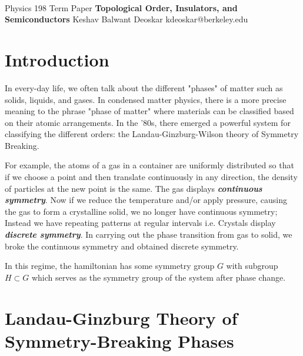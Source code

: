 \documentclass[11pt]{article}
\begin{document}
\thispagestyle{empty}
\bigskip \
\vspace{0.1cm}

\begin{center}
{\fontsize{22}{22} \selectfont Physics 198 Term Paper}
\vskip 16pt
{\fontsize{36}{36} \selectfont \bf \sffamily Topological Order, Insulators, and Semiconductors}
\vskip 24pt
{\fontsize{18}{18} \selectfont \rmfamily Keshav Balwant Deoskar} 
\vskip 6pt
{\fontsize{14}{14} \selectfont \ttfamily kdeoskar@berkeley.edu} 
\vskip 24pt
\end{center}


\microtoc
\newpage

\section{Introduction}
In every-day life, we often talk about the different "phases" of matter such as solids, liquids, and gases. In condensed matter physics, there is a more precise meaning to the phrase "phase of matter" where materials can be classified based on their atomic arrangements. In the '80s, there emerged a powerful system for classifying the different orders: the Landau-Ginzburg-Wilson theory of Symmetry Breaking. 

\vskip 0.5cm

For example, the atoms of a gas in a container are uniformly distributed so that if we choose a point and then translate continuously in any direction, the density of particles at the new point is the same. The gas displays \textbf{\emph{continuous symmetry}}. Now if we reduce the temperature and/or apply pressure, causing the gas to form a crystalline solid, we no longer have continuous symmetry; Instead we have repeating patterns at regular intervals i.e. Crystals display \emph{\textbf{discrete symmetry}}. In carrying out the phase transition from gas to solid, we broke the continuous symmetry and obtained discrete symmetry.

\vskip 0.5cm
In this regime, the hamiltonian has some symmetry group $G$ with subgroup $H \subset G$ which serves as the symmetry group of the system after phase change.


\section{Landau-Ginzburg Theory of Symmetry-Breaking Phases}
\end{document}
